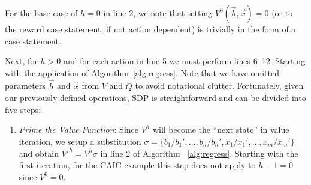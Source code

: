 \documentclass[twoside,11pt]{article}
\begin{document}
For the base case of $h=0$ in line 2, we note that setting $V^0(\vec{b},\vec{x}) = 0$
(or to the reward case statement, if not action dependent)
is trivially in the form of a case statement.

Next, for $h > 0$ and for each action in line 5 we must perform lines 6--12. Starting with the application of Algorithm~\ref{alg:regress}.  Note that we have omitted parameters $\vec{b}$ and
$\vec{x}$ from $V$ and $Q$ to avoid notational clutter.
Fortunately, given our previously defined
operations, SDP is straightforward and can be divided into five 
steps: 
\begin{enumerate}
\item {\it Prime the Value Function}: Since $V^{h}$ will become
the ``next state'' in value iteration, we setup a substitution
$\sigma = \{ b_1 / b_1', \ldots, b_n / b_n', x_1 / x_1', \ldots, x_m / x_m' \}$
and obtain $V'^{h} = V^{h}\sigma$ in line 2 of Algorithm ~\ref{alg:regress}. Starting with the first iteration, for the \textsc{CAIC} example this step does not apply to $h-1=0$ since $V^0=0$.


\end{enumerate}
\end{document}
